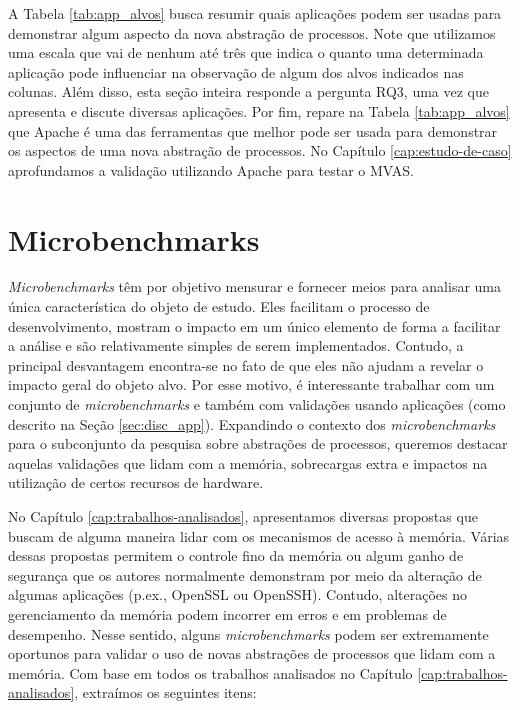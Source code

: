 A Tabela \ref{tab:app_alvos} busca resumir quais aplicações podem ser usadas
para demonstrar algum aspecto da nova abstração de processos. Note que
utilizamos uma escala que vai de nenhum  até três  que indica
o quanto uma determinada aplicação pode influenciar na observação de algum dos
alvos indicados nas colunas. Além disso, esta seção inteira responde a pergunta
RQ3, uma vez que apresenta e discute diversas aplicações. Por fim, repare na
Tabela \ref{tab:app_alvos} que Apache é uma das ferramentas que melhor pode ser
usada para demonstrar os aspectos de uma nova abstração de processos. No
Capítulo \ref{cap:estudo-de-caso} aprofundamos a validação utilizando Apache
para testar o MVAS.



\section{Microbenchmarks}
\label{sec:micro}

\emph{Microbenchmarks} têm por objetivo mensurar e fornecer meios para
analisar uma única característica do objeto de estudo. Eles
facilitam o processo de desenvolvimento,
mostram o impacto em um único elemento de forma a facilitar a análise e são
relativamente simples de serem implementados. Contudo, a principal desvantagem
encontra-se no fato de que eles não ajudam a revelar o impacto geral do objeto
alvo. Por esse motivo, é interessante trabalhar com um conjunto de
\emph{microbenchmarks} e também com validações usando aplicações (como
descrito na Seção \ref{sec:disc_app}). Expandindo o contexto dos
\emph{microbenchmarks} para o subconjunto da pesquisa sobre abstrações de
processos, queremos destacar aquelas validações que lidam com a memória,
sobrecargas extra e impactos na utilização de certos recursos de hardware.

No Capítulo \ref{cap:trabalhos-analisados}, apresentamos diversas propostas que
buscam de alguma maneira lidar com os mecanismos de acesso à memória. Várias
dessas propostas permitem o controle fino da memória ou algum ganho de
segurança que os autores normalmente demonstram por meio da alteração de
algumas aplicações (p.ex., OpenSSL ou OpenSSH). Contudo, alterações no
gerenciamento da memória podem incorrer em erros e em problemas de desempenho.
Nesse sentido, alguns \emph{microbenchmarks} podem ser extremamente oportunos
para validar o uso de novas abstrações de processos que lidam com a memória.
Com base em todos os trabalhos analisados no Capítulo
\ref{cap:trabalhos-analisados}, extraímos os seguintes itens:

